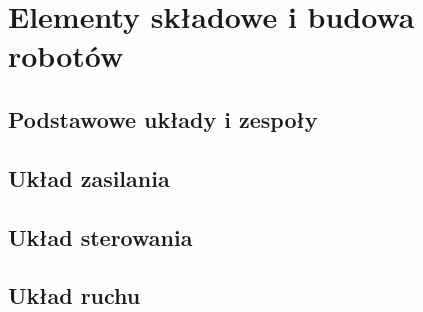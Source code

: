\section{Elementy składowe i budowa robotów}
\subsection{Podstawowe układy i zespoły}
\subsection{Układ zasilania}
\subsection{Układ sterowania}
\subsection{Układ ruchu}